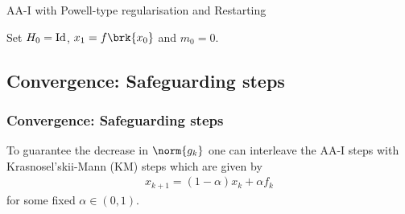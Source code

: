 \begin{frame}
	\begin{algorithm}[H]
	\caption{AA-I with Powell-type regularisation and Restarting}\label{alg:aa1-pr}
	\color{gray}
	\BlankLine
	Set $H_0=\operatorname{Id}$, $x_1=f\brk{x_0}$ and {\black $m_0 = 0$}.
	
	\end{algorithm}
\end{frame}

\subsection{Convergence: Safeguarding steps}
\begin{frame}
	\frametitle{Convergence: Safeguarding steps}
	To guarantee the decrease in $\norm{g_k}$ one can interleave the AA-I steps with Krasnosel'skii-Mann (KM) steps which are given by
	\begin{align*}
		x_{k+1}= (1-\alpha)x_k +\alpha f_k
	\end{align*}
	for some fixed $\alpha\in(0,1)$.
\end{frame}

\SetAlFnt{\scriptsize}

